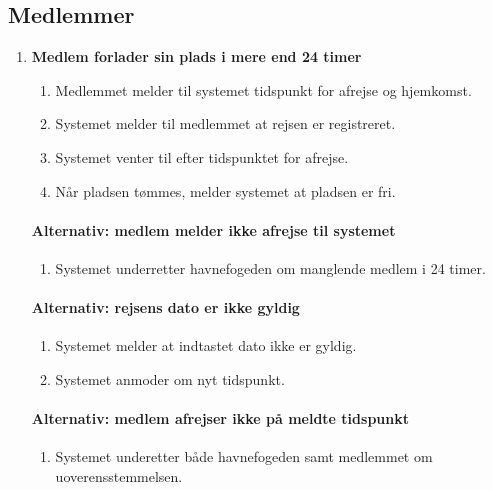 \subsection{Medlemmer}  
  \begin{enumerate}

    \item{\bf{Medlem forlader sin plads i mere end 24 timer}}
      \begin{enumerate}
        \item Medlemmet melder til systemet tidspunkt for afrejse og hjemkomst.
        \item Systemet melder til medlemmet at rejsen er registreret.
        \item Systemet venter til efter tidspunktet for afrejse.
        \item Når pladsen tømmes, melder systemet at pladsen er fri.
      \end{enumerate}

    \paragraph{Alternativ: medlem melder ikke afrejse til systemet}
      \begin{enumerate}
        \item Systemet underretter havnefogeden om manglende medlem i 24 timer.
      \end{enumerate}

    \paragraph{Alternativ: rejsens dato er ikke gyldig}
      \begin{enumerate}
        \item Systemet melder at indtastet dato ikke er gyldig.
        \item Systemet anmoder om nyt tidspunkt.
      \end{enumerate}

    \paragraph{Alternativ: medlem afrejser ikke på meldte tidspunkt}
      \begin{enumerate}
        \item Systemet underetter både havnefogeden samt medlemmet om uoverensstemmelsen.
      \end{enumerate}



\end{enumerate}
